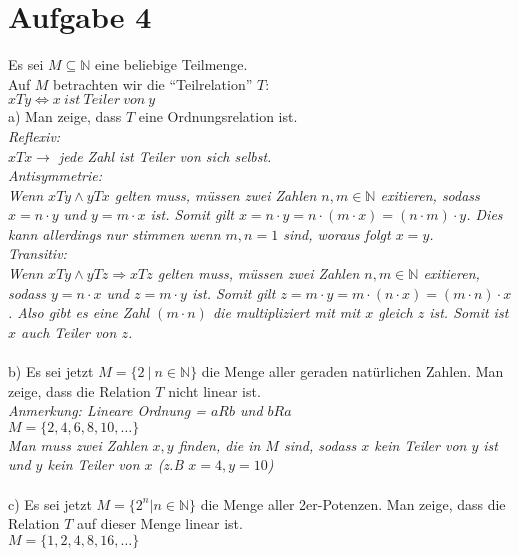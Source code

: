 \section*{Aufgabe 4}

Es sei $M \subseteq \mathbb{N}$ eine beliebige Teilmenge.\\
Auf $M$ betrachten wir die ``Teilrelation'' $T$:\\

$xTy \Leftrightarrow x \ ist \ Teiler \ von \ y$\\

a) Man zeige, dass $T$ eine Ordnungsrelation ist.\\

\textit{Reflexiv:}\\
\textit{$xTx \rightarrow$ jede Zahl ist Teiler von sich selbst.}\\

\textit{Antisymmetrie:}\\
\textit{Wenn $xTy \land yTx$ gelten muss, müssen zwei Zahlen $n,m \in \mathbb{N}$ exitieren, sodass $x = n \cdot y$ und $y = m \cdot x$ ist. Somit gilt $x = n \cdot y = n \cdot (m \cdot x) = (n \cdot m) \cdot y$. Dies kann allerdings nur stimmen wenn $m,n = 1$ sind, woraus folgt $x = y$.}\\

\textit{Transitiv:}\\
\textit{Wenn $xTy \land yTz \Rightarrow xTz$ gelten muss, müssen zwei Zahlen $n,m \in \mathbb{N}$ exitieren, sodass $y = n \cdot x$ und $z = m \cdot y$ ist. Somit gilt $z = m \cdot y = m \cdot (n \cdot x) = (m \cdot n) \cdot x$. Also gibt es eine Zahl $(m \cdot n)$ die multipliziert mit mit $x$ gleich $z$ ist. Somit ist $x$ auch Teiler von $z$.}\\~\\

b) Es sei jetzt $M = \{2 \ | \ n \in \mathbb{N}\}$ die Menge aller geraden natürlichen Zahlen. Man zeige, dass die Relation $T$ nicht linear ist.\\

\textit{Anmerkung: Lineare Ordnung = $aRb$ und $bRa$}\\

$M = \{2, 4, 6, 8, 10, \dots\}$\\

\textit{Man muss zwei Zahlen $x, y$ finden, die in $M$ sind, sodass $x$ kein Teiler von $y$ ist und $y$ kein Teiler von $x$ (z.B $x = 4, y = 10$)}\\~\\

c) Es sei jetzt $M = \{ 2^n | n \in \mathbb{N}\}$ die Menge aller 2er-Potenzen. Man zeige, dass die Relation
$T$ auf dieser Menge linear ist.\\

$M = \{1, 2, 4, 8, 16, \dots\}$

\newpage